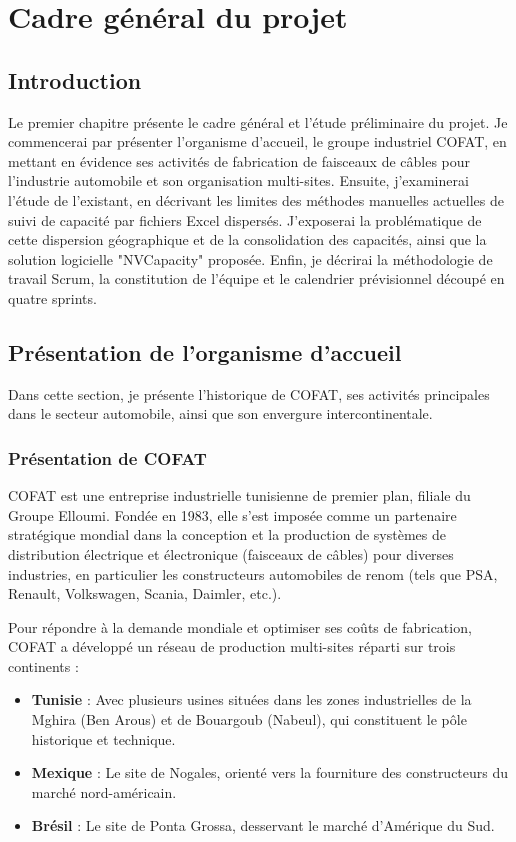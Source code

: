 \chapter{Cadre général du projet}

\section*{Introduction}

Le premier chapitre présente le cadre général et l'étude préliminaire du projet. Je commencerai par présenter l'organisme d'accueil, le groupe industriel COFAT, en mettant en évidence ses activités de fabrication de faisceaux de câbles pour l'industrie automobile et son organisation multi-sites. Ensuite, j'examinerai l'étude de l'existant, en décrivant les limites des méthodes manuelles actuelles de suivi de capacité par fichiers Excel dispersés. J'exposerai la problématique de cette dispersion géographique et de la consolidation des capacités, ainsi que la solution logicielle "NVCapacity" proposée. Enfin, je décrirai la méthodologie de travail Scrum, la constitution de l'équipe et le calendrier prévisionnel découpé en quatre sprints.

\section{Présentation de l’organisme d’accueil}

Dans cette section, je présente l'historique de COFAT, ses activités principales dans le secteur automobile, ainsi que son envergure intercontinentale.

\subsection{Présentation de COFAT}

COFAT est une entreprise industrielle tunisienne de premier plan, filiale du Groupe Elloumi. Fondée en 1983, elle s'est imposée comme un partenaire stratégique mondial dans la conception et la production de systèmes de distribution électrique et électronique (faisceaux de câbles) pour diverses industries, en particulier les constructeurs automobiles de renom (tels que PSA, Renault, Volkswagen, Scania, Daimler, etc.).

Pour répondre à la demande mondiale et optimiser ses coûts de fabrication, COFAT a développé un réseau de production multi-sites réparti sur trois continents :
\begin{itemize}
    \item \textbf{Tunisie} : Avec plusieurs usines situées dans les zones industrielles de la Mghira (Ben Arous) et de Bouargoub (Nabeul), qui constituent le pôle historique et technique.
    \item \textbf{Mexique} : Le site de Nogales, orienté vers la fourniture des constructeurs du marché nord-américain.
    \item \textbf{Brésil} : Le site de Ponta Grossa, desservant le marché d'Amérique du Sud.
\end{itemize}

